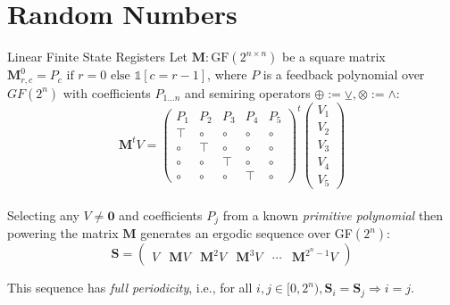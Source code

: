 \documentclass{beamer}
\begin{document}
    \section{Random Numbers}

    \begin{frame}{Linear Finite State Registers}
        Let $\textbf{M}: \text{GF}(2^{n\times n})$ be a square matrix $\mathbf{M}^0_{r, c} = P_c \text{ if } r=0 \text{ else } \mathds{1}[c = r - 1]$, where $P$ is a feedback polynomial over $GF(2^n)$ with coefficients $P_{1\ldots n}$ and semiring operators $\oplus := \veebar, \otimes := \land$:\\

        \[
            \mathbf{M}^tV = \begin{pmatrix}
                P_1 & P_2 & P_3 & P_4 & P_5 \\
                \top & \circ & \circ & \circ & \circ \\
                \circ & \top & \circ & \circ & \circ \\
                \circ & \circ & \top & \circ & \circ \\
                \circ & \circ & \circ & \top & \circ
            \end{pmatrix}^t
            \begin{pmatrix}
                V_1 \\
                V_2 \\
                V_3 \\
                V_4 \\
                V_5
            \end{pmatrix}
        \]\\

        Selecting any $V \neq \mathbf{0}$ and coefficients $P_j$ from a known \textit{primitive polynomial} then powering the matrix $\mathbf{M}$ generates an ergodic sequence over GF$(2^n)$:\\

        \[
        \mathbf{S} = \begin{pmatrix}V & \mathbf{M}V & \mathbf{M}^{2}V & \mathbf{M}^{3}V & \cdots & \mathbf{M}^{2^n-1}V \end{pmatrix}
        \]

        This sequence has \textit{full periodicity}, i.e., for all $i, j \in [0, 2^n), \mathbf{S}_i = \mathbf{S}_j \Rightarrow i = j$.
    \end{frame}
\end{document}
